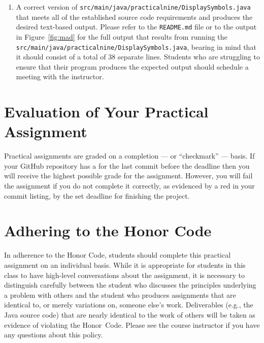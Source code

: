 \documentclass[11pt]{article}
\newcommand{\mainprogramsource}{\lstinline{src/main/java/practicalnine/DisplaySymbols.java}}
\newcommand{\program}[1]{\lstinline{#1}}
\newcommand{\checkmark}{\ding{51}}
\newcommand{\naughtmark}{\ding{55}}
\begin{document}

\begin{enumerate}

\setlength{\itemsep}{0in}

\item A correct version of \mainprogramsource{} that meets all of the
  established source code requirements and produces the desired text-based
  output. Please refer to the {\tt README.md} file or to the output in
  Figure~\ref{fig:mad} for the full output that results from running the
  \mainprogramsource, bearing in mind that it should consist of a total of 38
  separate lines. Students who are struggling to ensure that their program
  produces the expected output should schedule a meeting with the instructor.

\end{enumerate}

\section*{Evaluation of Your Practical Assignment}

Practical assignments are graded on a completion --- or ``checkmark'' --- basis.
If your GitHub repository has a \checkmark{} for the last commit before the
deadline then you will receive the highest possible grade for the assignment.
However, you will fail the assignment if you do not complete it correctly, as
evidenced by a red \naughtmark{} in your commit listing, by the set deadline for
finishing the project.

\section*{Adhering to the Honor Code}

In adherence to the Honor Code, students should complete this practical
assignment on an individual basis. While it is appropriate for students in this
class to have high-level conversations about the assignment, it is necessary to
distinguish carefully between the student who discusses the principles
underlying a problem with others and the student who produces assignments that
are identical to, or merely variations on, someone else's work. Deliverables
(e.g., the Java source code) that are nearly identical to the work of others
will be taken as evidence of violating the \mbox{Honor Code}. Please see the
course instructor if you have any questions about this policy.
\end{document}

